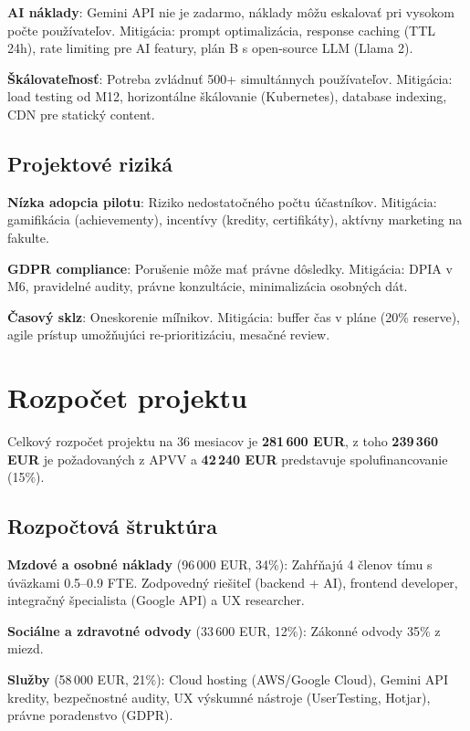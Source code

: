 \documentclass[10pt,twocolumn,twoside,slovak,a4paper]{article}
\begin{document}
\textbf{AI náklady}: Gemini API nie je zadarmo, náklady môžu eskalovať pri vysokom počte používateľov. Mitigácia: prompt optimalizácia, response caching (TTL 24h), rate limiting pre AI featury, plán B s open-source LLM (Llama 2).

\textbf{Škálovateľnosť}: Potreba zvládnuť 500+ simultánnych používateľov. Mitigácia: load testing od M12, horizontálne škálovanie (Kubernetes), database indexing, CDN pre statický content.

\subsection{Projektové riziká}

\textbf{Nízka adopcia pilotu}: Riziko nedostatočného počtu účastníkov. Mitigácia: gamifikácia (achievementy), incentívy (kredity, certifikáty), aktívny marketing na fakulte.

\textbf{GDPR compliance}: Porušenie môže mať právne dôsledky. Mitigácia: DPIA v M6, pravidelné audity, právne konzultácie, minimalizácia osobných dát.

\textbf{Časový sklz}: Oneskorenie míľnikov. Mitigácia: buffer čas v pláne (20\% reserve), agile prístup umožňujúci re-prioritizáciu, mesačné review.

\section{Rozpočet projektu}

Celkový rozpočet projektu na 36 mesiacov je \textbf{281\,600 EUR}, z toho \textbf{239\,360 EUR} je požadovaných z APVV a \textbf{42\,240 EUR} predstavuje spolufinancovanie (15\%).

\subsection{Rozpočtová štruktúra}

\textbf{Mzdové a osobné náklady} (96\,000 EUR, 34\%): Zahŕňajú 4 členov tímu s úväzkami 0.5--0.9 FTE. Zodpovedný riešiteľ (backend + AI), frontend developer, integračný špecialista (Google API) a UX researcher.

\textbf{Sociálne a zdravotné odvody} (33\,600 EUR, 12\%): Zákonné odvody 35\% z miezd.

\textbf{Služby} (58\,000 EUR, 21\%): Cloud hosting (AWS/Google Cloud), Gemini API kredity, bezpečnostné audity, UX výskumné nástroje (UserTesting, Hotjar), právne poradenstvo (GDPR).
\end{document}
